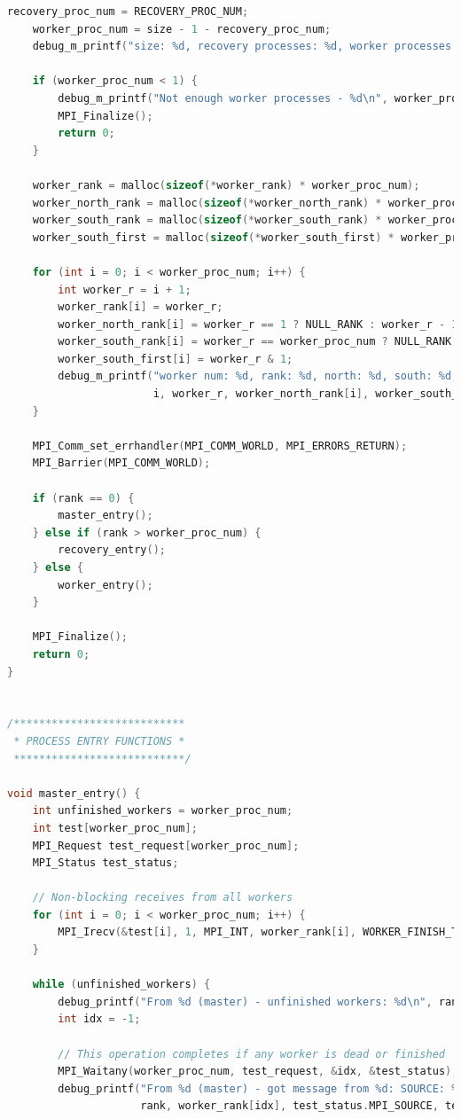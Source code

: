\documentclass[a4paper]{article}
\begin{document}
\begin{lstlisting}[caption=jac\_3d\_mpi\_ft.c, label={lst:2}, language=C]
    recovery_proc_num = RECOVERY_PROC_NUM;
    worker_proc_num = size - 1 - recovery_proc_num;
    debug_m_printf("size: %d, recovery processes: %d, worker processes: %d\n", size, recovery_proc_num, worker_proc_num);

    if (worker_proc_num < 1) {
        debug_m_printf("Not enough worker processes - %d\n", worker_proc_num);
        MPI_Finalize();
        return 0;
    }

    worker_rank = malloc(sizeof(*worker_rank) * worker_proc_num);
    worker_north_rank = malloc(sizeof(*worker_north_rank) * worker_proc_num);
    worker_south_rank = malloc(sizeof(*worker_south_rank) * worker_proc_num);
    worker_south_first = malloc(sizeof(*worker_south_first) * worker_proc_num);

    for (int i = 0; i < worker_proc_num; i++) {
        int worker_r = i + 1;
        worker_rank[i] = worker_r;
        worker_north_rank[i] = worker_r == 1 ? NULL_RANK : worker_r - 1;
        worker_south_rank[i] = worker_r == worker_proc_num ? NULL_RANK : worker_r + 1;
        worker_south_first[i] = worker_r & 1;
        debug_m_printf("worker num: %d, rank: %d, north: %d, south: %d, south_first: %d\n",
                       i, worker_r, worker_north_rank[i], worker_south_rank[i], worker_south_first[i]);
    }

    MPI_Comm_set_errhandler(MPI_COMM_WORLD, MPI_ERRORS_RETURN);
    MPI_Barrier(MPI_COMM_WORLD);

    if (rank == 0) {
        master_entry();
    } else if (rank > worker_proc_num) {
        recovery_entry();
    } else {
        worker_entry();
    }

    MPI_Finalize();
    return 0;
}


/***************************
 * PROCESS ENTRY FUNCTIONS *
 ***************************/

void master_entry() {
    int unfinished_workers = worker_proc_num;
    int test[worker_proc_num];
    MPI_Request test_request[worker_proc_num];
    MPI_Status test_status;

    // Non-blocking receives from all workers
    for (int i = 0; i < worker_proc_num; i++) {
        MPI_Irecv(&test[i], 1, MPI_INT, worker_rank[i], WORKER_FINISH_TAG, MPI_COMM_WORLD, &test_request[i]);
    }

    while (unfinished_workers) {
        debug_printf("From %d (master) - unfinished workers: %d\n", rank, unfinished_workers);
        int idx = -1;

        // This operation completes if any worker is dead or finished
        MPI_Waitany(worker_proc_num, test_request, &idx, &test_status);
        debug_printf("From %d (master) - got message from %d: SOURCE: %d, TAG: %d, ERROR: %d\n",
                     rank, worker_rank[idx], test_status.MPI_SOURCE, test_status.MPI_TAG, test_status.MPI_ERROR);


\end{lstlisting}
\end{document}
